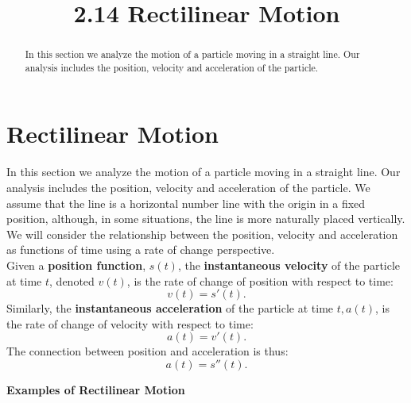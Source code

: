 \documentclass{ximera}
\title{2.14 Rectilinear Motion}
\begin{document}
\begin{abstract}
In this section we analyze the motion of a particle moving in a straight line. Our
analysis includes the position, velocity and acceleration of the particle.
\end{abstract}

\maketitle


\section{Rectilinear Motion}

In this section we analyze the motion of a particle moving in a straight line. Our
analysis includes the position, velocity and acceleration of the particle.
We assume that the line is a horizontal number line with the origin in a fixed position, although, in some situations, 
the line is more naturally placed vertically. We will consider the relationship between the position, 
velocity and acceleration as functions of time using a rate of change perspective. \\
Given a \textbf{position function}, $s(t)$, the \textbf{instantaneous velocity} of the particle at time $t$, 
denoted $v(t)$, is the rate of change of position 
with respect to time:
\[v(t) = s'(t).\]
Similarly, the \textbf{instantaneous acceleration} of the particle at time $t, a(t)$, is the rate of change of 
velocity with respect to time:
\[a(t) = v'(t).\]
The connection between position and acceleration is thus:
\[a(t) = s''(t).\]

\begin{center}
\bf{Examples of Rectilinear Motion}
\end{center}
\end{document}
